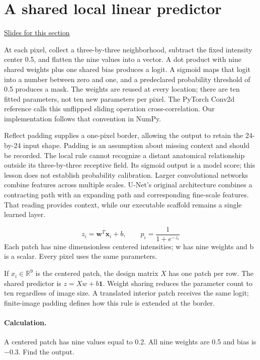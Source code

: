 \documentclass[11pt,letterpaper]{article}
\theoremstyle{definition}\newtheorem{definition}{Definition}\newtheorem{example}{Example}
\numberwithin{equation}{section}
\begin{document}
\section{A shared local linear predictor}
\hypertarget{note-a-shared-local-linear-predictor}{}\label{note:a-shared-local-linear-predictor}
{\small \href{slides.html\#frame=a-local-shared-predictor\&step=1}{Slides for this section}}\par
At each pixel, collect a three-by-three neighborhood, subtract the fixed intensity center 0.5, and flatten the nine values into a vector. A dot product with nine shared weights plus one shared bias produces a logit. A sigmoid maps that logit into a number between zero and one, and a predeclared probability threshold of 0.5 produces a mask. The weights are reused at every location; there are ten fitted parameters, not ten new parameters per pixel. The PyTorch Conv2d reference calls this unflipped sliding operation cross-correlation. Our implementation follows that convention in NumPy.

Reflect padding supplies a one-pixel border, allowing the output to retain the 24-by-24 input shape. Padding is an assumption about missing context and should be recorded. The local rule cannot recognize a distant anatomical relationship outside its three-by-three receptive field. Its sigmoid output is a model score; this lesson does not establish probability calibration. Larger convolutional networks combine features across multiple scales. U-Net's original architecture combines a contracting path with an expanding path and corresponding fine-scale features. That reading provides context, while our executable scaffold remains a single learned layer.

\[
z_i=\mathbf{w}^{T}\mathbf{x}_i+b,\qquad p_i=\frac{1}{1+e^{-z_i}}
\]
Each patch has nine dimensionless centered intensities; w has nine weights and b is a scalar. Every pixel uses the same parameters.

If $x_i\in\mathbb R^9$ is the centered patch, the design matrix $X$ has one patch per row. The shared predictor is $z=Xw+b\boldsymbol1$. Weight sharing reduces the parameter count to ten regardless of image size. A translated interior patch receives the same logit; finite-image padding defines how this rule is extended at the border.

\paragraph{Calculation.} A centered patch has nine values equal to 0.2. All nine weights are 0.5 and bias is \ensuremath{-}0.3. Find the output.
\end{document}
